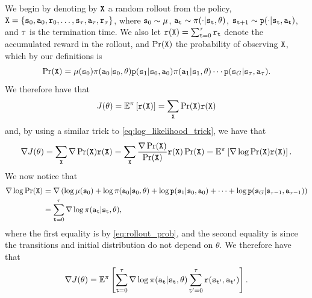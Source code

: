 We begin by denoting by $\texttt{X}$ a random rollout from the policy, $\texttt{X} = \{{\tt s}_0,{\tt a}_0,{\tt r}_0,\dots,{\tt s}_\tau, {\tt a}_\tau, {\tt r}_\tau \}$, where ${\tt s}_0 \sim \mu$, ${\tt a}_{\tt t}\sim \pi(\cdot|{\tt s}_{\tt t},\theta)$, ${\tt s}_{{\tt t}+1} \sim {\tt p} (\cdot | {\tt s}_{\tt t}, {\tt a}_{\tt t})$, and $\tau$ is the termination time. We also let ${\tt r}(\texttt{X}) = \sum_{{\tt t}=0}^\tau {\tt r}_{\tt t}$ denote the accumulated reward in the rollout, and $\Pr(\texttt{X})$ the probability of observing $\texttt{X}$, which by our definitions is 
\begin{equation}\label{eq:rollout_prob}
\Pr(\texttt{X}) = \mu({\tt s}_0)\pi({\tt a}_0|{\tt s}_0,\theta){\tt p}({\tt s}_1|{\tt s}_0,{\tt a}_0)\pi({\tt a}_1|{\tt s}_1,\theta)\cdots{\tt p}({\tt s}_G|{\tt s}_{\tau},{\tt a}_{\tau}).
\end{equation}
We therefore have that
\begin{equation*}
    J(\theta) = \mathbb{E}^{\pi}\left[ {\tt r}(\texttt{X}) \right] = \sum_{\texttt{X}} \Pr(\texttt{X}) {\tt r}(\texttt{X})
\end{equation*}
and, by using a similar trick to \eqref{eq:log_likelihood_trick}, we have that 
\begin{equation*}
    \nabla J(\theta) = \sum_{\texttt{X}} \nabla \Pr(\texttt{X}) {\tt r}(\texttt{X}) = \sum_{\texttt{X}} \frac{\nabla \Pr(\texttt{X})}{\Pr(\texttt{X})} {\tt r}(\texttt{X}) \Pr(\texttt{X}) = \mathbb{E}^{\pi}\left[ \nabla \log \Pr(\texttt{X}){\tt r}(\texttt{X}) \right].
\end{equation*}
We now notice that 
\begin{equation*}
\begin{split}
    \nabla \log \Pr(\texttt{X}) &= \nabla \left( \log \mu({\tt s}_0) + \log \pi({\tt a}_0|{\tt s}_0,\theta) + \log{\tt p}({\tt s}_1|{\tt s}_0,{\tt a}_0) + \dots + \log{\tt p}({\tt s}_G|{\tt s}_{\tau-1},{\tt a}_{\tau-1})\right) \\
    &= \sum_{{\tt t}=0}^{\tau} \nabla\log \pi({\tt a}_{\tt t}|{\tt s}_{\tt t},\theta),
\end{split}
\end{equation*}
where the first equality is by \eqref{eq:rollout_prob}, and the second equality is since the transitions and initial distribution do not depend on $\theta$. We therefore have that
\begin{equation}\label{eq:pg_score_1}
    \nabla J(\theta) = \mathbb{E}^{\pi}\left[ \sum_{{\tt t}=0}^\tau \nabla\log \pi({\tt a}_{\tt t}|{\tt s}_{\tt t},\theta) \sum_{{\tt t}'=0}^\tau {\tt r}({\tt s}_{{\tt t}'},{\tt a}_{{\tt t}'})\right].
\end{equation}
